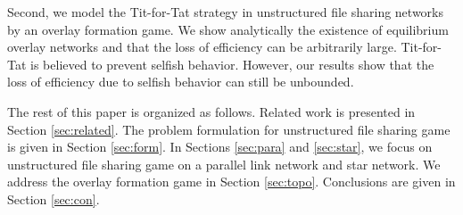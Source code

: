 \documentclass[conference]{IEEEtran}
\begin{document}
Second, we model the Tit-for-Tat strategy in unstructured file
sharing networks by an overlay formation game. We show
analytically the existence of equilibrium overlay networks and
that the loss of efficiency can be arbitrarily large. Tit-for-Tat
is believed to prevent selfish behavior. However, our results show
that the loss of efficiency due to selfish behavior can still be
unbounded.

The rest of this paper is organized as follows. Related work is
presented in Section \ref{sec:related}. The problem formulation
for unstructured file sharing game is given in Section
\ref{sec:form}. In Sections \ref{sec:para} and \ref{sec:star}, we
focus on unstructured file sharing game on a parallel link network
and star network. We address the overlay formation game in Section
\ref{sec:topo}. Conclusions are given in Section \ref{sec:con}.

\begin{comment}

We first demonstrate that there exists a unique Nash equilibrium
in the unstructured file sharing game when user's benefit includes
only utility. At the Nash equilibrium, each user opens maximum
allowable number of connections on each available path.
Furthermore, the price of anarchy can be unbounded if users can
open arbitrarily large number of data transfer sessions.

If user's benefit includes both utility and cost, then we
demonstrate through simple examples that there might exist
multiple Nash equilibria in unstructured file sharing games.

Then, we focus on two specific network topologies: parallel link
topology and star topology. We show that Nash equilibrium exists
for the games on these two kinds of topologies, and there are
losses of efficiency at those Nash equilibria.

(.....)

(... network formation game using tit-for-tat ...)
\end{comment}



\begin{comment}
Then, we suppose that all users of such kind of overlay network
use multi-path congestion controller recently proposed by \cite{}
and \cite{}. We demonstrate in Section \ref{sec:un-coord} that
multi-path congestion controller is able to improve the average
throughtput of such kind of networks when compared with the
multiple un-coordinated congestion controllers which are adopted
by BitTorrent networks.
\end{comment}
\end{document}

